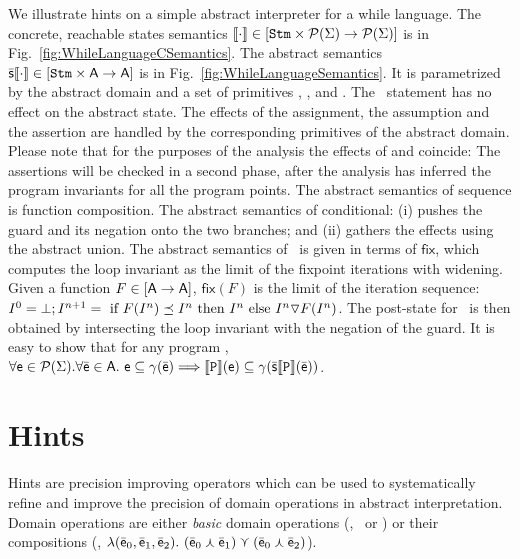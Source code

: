\documentclass{llncs}
\begin{document}
We illustrate hints on a simple abstract interpreter for a while language.
The concrete, reachable states semantics $\llbracket \mathtt{\cdot} \rrbracket \in [\mathtt{Stm} \times \mathcal{P}{(\Sigma)} \rightarrow\mathcal{P}{(\Sigma)}]$ is in Fig.~\ref{fig:WhileLanguageCSemantics}.
The abstract semantics $\mathbb{\bar{\mathsf{s}}}\llbracket \mathtt{\cdot} \rrbracket \in [\mathtt{Stm} \times \mathsf{A} \rightarrow\mathsf{A}]$  is  in Fig.~\ref{fig:WhileLanguageSemantics}.
It is  parametrized by the abstract domain  and a set of primitives \assign, \guard, and \checkif.
The \Skip\ statement has no effect on the abstract state.
The effects of the assignment, the assumption and the assertion  are handled by the corresponding primitives of the abstract domain.
Please note that for the purposes of the analysis the effects of \Assume and \Assert coincide: 
The assertions will be checked in a second phase, after the analysis has inferred  the program invariants for all the program points.
The abstract semantics of sequence is function composition.
The abstract semantics of conditional: (i) pushes the guard and its negation onto the two branches; and (ii) gathers the effects using the abstract union.
The abstract semantics of \While\ is given in terms of $\mathsf{fix}$, which computes the loop invariant as the limit of the fixpoint iterations with widening.
Given a function $F \in [\mathsf{A} \rightarrow\mathsf{A}]$, $\mathsf{fix}(F)$ is the limit of the iteration sequence:
$ I^0 = \bot; 
I^{n+1} =  \text{ if } F(I^{n}) \preceq I^{n} \text{ then } I^{n} \text{ else }  I^{n} \triangledown F(I^{n})$.
The post-state for  \While\ is then obtained by intersecting the loop invariant with the negation of the guard.
It is easy to show that for any program , $\forall \mathsf{e} \in \mathcal{P}{(\Sigma)}. \forall \bar{\mathsf{\mathsf{e}}} \in \mathsf{A}.\ \mathsf{e} \subseteq \gamma(\bar{\mathsf{\mathsf{e}}}) \Longrightarrow \llbracket \mathtt{P} \rrbracket(\mathsf{e}) \subseteq \gamma(\mathbb{\bar{\mathsf{s}}}\llbracket \mathtt{P} \rrbracket(\bar{\mathsf{\mathsf{e}}}))$.




\section{Hints}
Hints are precision improving operators which can be used
to systematically refine and improve the precision of domain
operations in abstract interpretation.
Domain operations are either  \emph{basic} domain operations (\eg, \cjoin\
or \cmeet)
or their compositions (\eg, $\lambda (\bar{\mathsf{\mathsf{e}}}_0, \bar{\mathsf{\mathsf{e}}}_1,
\bar{\mathsf{\mathsf{e}}}_2).\ (\bar{\mathsf{\mathsf{e}}}_0 \curlywedge \bar{\mathsf{\mathsf{e}}}_1) \curlyvee  (\bar{\mathsf{\mathsf{e}}}_0 \curlywedge \bar{\mathsf{\mathsf{e}}}_2)$).
\end{document}
